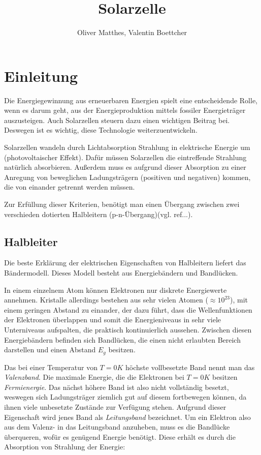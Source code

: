\documentclass[slug=SZ, room=Hermann-Krone-Bau\,\ Labor\ 1.25, supervisor=Martin\ Kroll]{../../Lab_Report_LaTeX/lab_report}
\title{Solarzelle}
\author{Oliver Matthes, Valentin Boettcher}
\begin{document}
\maketitle

\section{Einleitung}
\label{sec:einl}

Die Energiegewinnung aus erneuerbaren Energien spielt eine entscheidende Rolle, wenn es darum geht,
aus der Energieproduktion mittels fossiler Energieträger auszusteigen.
Auch Solarzellen steuern dazu einen wichtigen Beitrag bei. Deswegen ist es wichtig, diese
Technologie weiterzuentwickeln.

Solarzellen wandeln durch Lichtabsorption Strahlung in elektrische Energie um (photovoltaischer Effekt).
Dafür müssen Solarzellen die eintreffende Strahlung natürlich absorbieren. 
Außerdem muss es aufgrund dieser Absorption zu einer Anregung von beweglichen Ladungsträgern
(positiven und negativen) kommen, die von einander getrennt werden müssen.

Zur Erfüllung dieser Kriterien, benötigt man einen Übergang zwischen zwei verschieden dotierten
Halbleitern (p-n-Übergang)(vgl. ref...).

\subsection{Halbleiter}
\label{sec:halbleiter}

Die beste Erklärung der elektrischen Eigenschaften von Halbleitern liefert das Bändermodell.
Dieses Modell besteht aus Energiebändern und Bandlücken.

In einem einzelnem Atom können Elektronen nur diskrete Energiewerte annehmen.
Kristalle allerdings bestehen aus sehr vielen Atomen (\(\approx 10^{23}\)), mit einem geringen Abstand zu einander,
der dazu führt, dass die Wellenfunktionen der Elektronen überlappen und somit die Energieniveaus in sehr
viele Unterniveaus aufspalten, die praktisch kontinuierlich aussehen.
Zwischen diesen Energiebändern befinden sich Bandlücken, die einen nicht erlaubten Bereich darstellen und
einen Abstand \(E_g\) besitzen.

Das bei einer Temperatur von  \(T=0 K\)  höchste vollbesetzte Band nennt man das \emph{Valenzband}.
Die maximale Energie, die die Elektronen bei \(T=0 K\) besitzen \emph{Fermienergie}. Das nächst höhere Band ist
also nicht vollständig besetzt, weswegen sich Ladungsträger ziemlich gut auf diesem fortbewegen können, da
ihnen viele unbesetzte Zustände zur Verfügung stehen.
Aufgrund dieser Eigenschaft wird jenes Band als \emph{Leitungsband} bezeichnet.
Um ein Elektron also aus dem Valenz- in das Leitungsband anzuheben, muss es die Bandlücke überqueren,
wofür es genügend Energie benötigt. Diese erhält es durch die Absorption von Strahlung der Energie:
\end{document}
